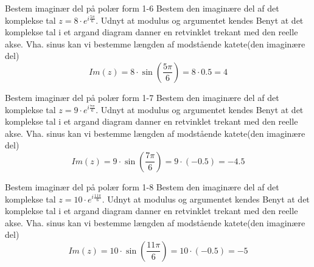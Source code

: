 \documentclass{article}
\begin{document}
\newpage
\begin{exercise}{Bestem imaginær del på polær form 1-6}
Bestem den imaginære del af det komplekse tal $z = 8 \cdot e^{i \frac{5 \pi}{6}}$.
\hint
Udnyt at modulus og argumentet kendes
\hint
Benyt at det komplekse tal i et argand diagram danner en retvinklet trekant med den reelle akse.
\hint
Vha. sinus kan vi bestemme længden af modstående katete(den imaginære del)
\[Im(z) = 8 \cdot \sin\left(\frac{5\pi}{6}\right) = 8 \cdot 0.5 = 4
\]
\end{exercise}
\newpage
\begin{exercise}{Bestem imaginær del på polær form 1-7}
Bestem den imaginære del af det komplekse tal $z = 9 \cdot e^{i \frac{7 \pi}{6}}$.
\hint
Udnyt at modulus og argumentet kendes
\hint
Benyt at det komplekse tal i et argand diagram danner en retvinklet trekant med den reelle akse.
\hint
Vha. sinus kan vi bestemme længden af modstående katete(den imaginære del)
\[Im(z) = 9 \cdot \sin\left(\frac{7 \pi}{6}\right) = 9 \cdot (-0.5) = - 4.5
\]
\end{exercise}
\newpage
\begin{exercise}{Bestem imaginær del på polær form 1-8}
Bestem den imaginære del af det komplekse tal $z = 10 \cdot e^{i \frac{11 \pi}{6}}$.
\hint
Udnyt at modulus og argumentet kendes
\hint
Benyt at det komplekse tal i et argand diagram danner en retvinklet trekant med den reelle akse.
\hint
Vha. sinus kan vi bestemme længden af modstående katete(den imaginære del)
\[Im(z) = 10 \cdot \sin\left(\frac{11 \pi}{6}\right) = 10 \cdot (-0.5) = - 5
\]
\end{exercise}
\end{document}
